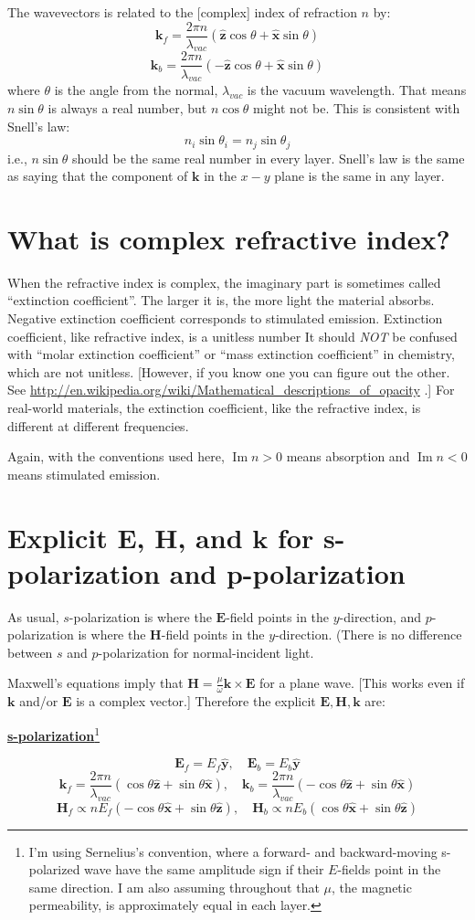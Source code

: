 \documentclass[12pt]{article}
\renewcommand{\(}{\left(}
\renewcommand{\)}{\right)}
\renewcommand{\Im}{\operatorname{Im}}
\newcommand{\E}{\mathbf{E}}
\renewcommand{\H}{\mathbf{H}}
\renewcommand{\k}{\mathbf{k}}
\newcommand{\x}{\hat{\mathbf{x}}}
\newcommand{\y}{\hat{\mathbf{y}}}
\newcommand{\z}{\hat{\mathbf{z}}}
\begin{document}
The wavevectors is related to the [complex] index of refraction $n$ by:
$$\k_f = \frac{2\pi n}{\lambda_{vac}}(\z \cos \theta + \x \sin \theta)$$
$$\k_b = \frac{2\pi n}{\lambda_{vac}}(-\z \cos \theta + \x \sin \theta)$$
where $\theta$ is the angle from the normal, $\lambda_{vac}$ is the vacuum wavelength. That means $n \sin \theta$ is always a real number, but $n \cos \theta$ might not be. This is consistent with Snell's law:
$$n_i \sin \theta_i = n_j \sin \theta_j$$
i.e., $n\sin \theta$ should be the same real number in every layer. Snell's law is the same as saying that the component of $\k$ in the $x-y$ plane is the same in any layer.

\section{What is complex refractive index?}

When the refractive index is complex, the imaginary part is sometimes called ``extinction coefficient''. The larger it is, the more light the material absorbs. Negative extinction coefficient corresponds to stimulated emission. Extinction coefficient, like refractive index, is a unitless number It should \emph{NOT} be confused with ``molar extinction coefficient'' or ``mass extinction coefficient'' in chemistry, which are not unitless. [However, if you know one you can figure out the other. See \url{http://en.wikipedia.org/wiki/Mathematical_descriptions_of_opacity} .] For real-world materials, the extinction coefficient, like the refractive index, is different at different frequencies.

Again, with the conventions used here, $\Im n>0$ means absorption and $\Im n<0$ means stimulated emission.

\section{Explicit $\E$, $\H$, and $\k$ for s-polarization and p-polarization}

As usual, $s$-polarization is where the $\E$-field points in the $y$-direction, and $p$-polarization is where the $\H$-field points in the $y$-direction. (There is no difference between $s$ and $p$-polarization for normal-incident light.

Maxwell's equations imply that $\H = \frac{\mu}{\omega}\k \times \E$ for a plane wave. [This works even if $\k$ and/or $\E$ is a complex vector.] Therefore the explicit $\E,\H,\k$ are:

\begin{center} {\bf \underline{s-polarization}}\footnote{I'm using Sernelius's convention, where a forward- and backward-moving s-polarized wave have the same amplitude sign if their $E$-fields point in the same direction. I am also assuming throughout that $\mu$, the magnetic permeability, is approximately equal in each layer.}
 \end{center}
$$\E_f = E_f \y, \quad \E_b = E_b \y$$
$$\k_f =\frac{2\pi n}{\lambda_{vac}}\( \cos \theta \z + \sin \theta \x\), \quad \k_b = \frac{2\pi n}{\lambda_{vac}}\(- \cos \theta \z + \sin \theta \x\)$$
$$\H_f \propto  n E_f \( - \cos \theta \x +  \sin \theta \z\), \quad \H_b \propto n E_b\( \cos \theta \x + \sin \theta \z\)$$
\end{document}
